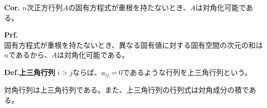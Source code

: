 \documentclass[a4paper,11pt]{jsarticle}
\numberwithin{equation}{section}
\begin{document}
\begin{itembox}[l]{\textbf{Cor.}}
  $n$次正方行列$A$の固有方程式が重根を持たないとき、$A$は対角化可能である。  

\end{itembox}
\textbf{Prf.}\\
固有方程式が重根を持たないとき、異なる固有値に対する固有空間の次元の和は$n$であるから、$A$は対角化可能である。\hfill\qedsymbol\\

\begin{itembox}[l]{\textbf{Def.上三角行列}}
  $i>j$ならば、$a_{ij} = 0$であるような行列を上三角行列という。
\end{itembox}
対角行列は上三角行列である。また、上三角行列の行列式は対角成分の積である。\\
\end{document}
